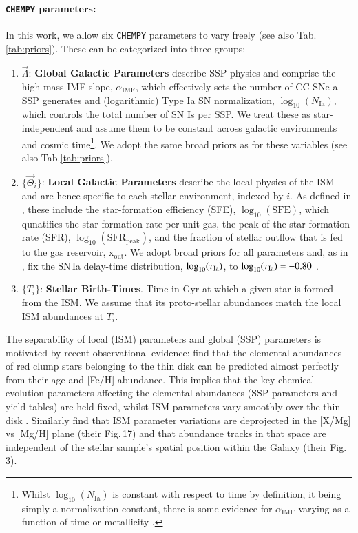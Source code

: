\documentclass{aa}
\begin{document}
\paragraph{\texttt{CHEMPY} parameters:}
In this work, we allow six \texttt{CHEMPY} parameters to vary freely (see also Tab.\,\ref{tab:priors}). These can be categorized into three groups:
\begin{enumerate}
     \item $\vec\Lambda$: \textbf{Global Galactic Parameters} describe SSP physics and comprise the high-mass \citet{2003PASP..115..763C} IMF slope, $\alpha_\mathrm{IMF}$, which effectively sets the number of CC-SNe a SSP generates and (logarithmic) Type Ia SN normalization, $\log_{10}(N_\mathrm{Ia})$, which controls the total number of SN Is per SSP. We treat these as star-independent and assume them to be constant across galactic environments and cosmic time\footnote{Whilst $\log_{10}(N_\mathrm{Ia})$ is constant with respect to time by definition, it being simply a normalization constant, there is some evidence for $\alpha_\mathrm{IMF}$ varying as a function of time or metallicity \citep{Chabrier2014,2016MNRAS.462.2832C,2019MNRAS.482..118G,Martin2019}.}. 
     We adopt the same broad priors as \citep{Philcox_2019} for these variables (see also Tab.\ref{tab:priors}). 
     \item $\{\vec\Theta_i\}$: \textbf{Local Galactic Parameters} describe the local physics of the ISM and are hence specific to each stellar environment, indexed by $i$. As defined in \citep{Rybizki_2017}, these include the star-formation efficiency (SFE), $\log_{10}(\text{SFE})$, which qunatifies the star formation rate per unit gas, the peak of the star formation rate (SFR), $\log_{10}(\mathrm{SFR}_\mathrm{peak})$, and the fraction of stellar outflow that is fed to the gas reservoir, $\mathrm{x}_\mathrm{out}$. We adopt broad priors for all parameters and, as in \citep{Philcox_2019}, fix the SN\,Ia delay-time distribution, $\log_{10}(\tau_{\rm Ia})$, to $\log_{10}(\tau_{\rm Ia})=-0.80$ \citep[see also][]{Philcox_2018}.
     \item $\{T_i\}$: \textbf{Stellar Birth-Times}. Time in Gyr at which a given star is formed from the ISM. We assume that its proto-stellar abundances match the local ISM abundances at $T_i$.
\end{enumerate}

The separability of local (ISM) parameters and global (SSP) parameters is motivated by recent observational evidence: \citet{2019arXiv190710606N} find that the elemental abundances of red clump stars belonging to the thin disk can be predicted almost perfectly from their age and [Fe/H] abundance. This implies that the key chemical evolution parameters affecting the elemental abundances (SSP parameters and yield tables) are held fixed, whilst ISM parameters vary smoothly over the thin disk \citep[which offsets the metallicity for different galactocentric radii, e.g.][for a simulated example]{Buck2020, Wang2024}. Similarly \cite{2019ApJ...874..102W} find that ISM parameter variations are deprojected in the [X/Mg] vs [Mg/H] plane (their Fig.\,17) and that abundance tracks in that space are independent of the stellar sample's spatial position within the Galaxy (their Fig.\,3).
\end{document}
